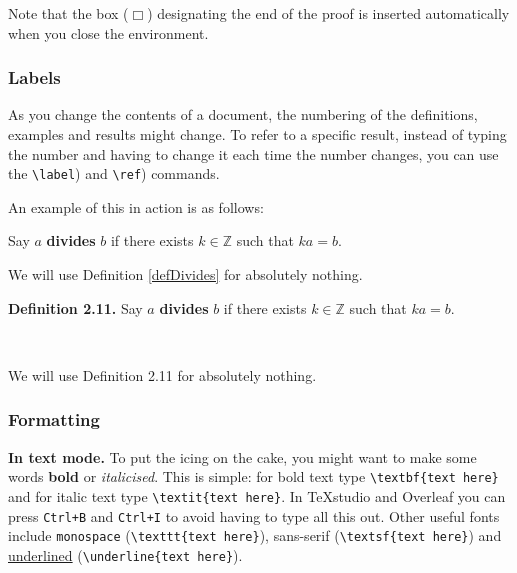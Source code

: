 Note that the box ($\Box$) designating the end of the proof is inserted automatically when you close the  environment.

\subsubsection*{Labels}
As you change the contents of a document, the numbering of the definitions, examples and results might change. To refer to a specific result, instead of typing the number and having to change it each time the number changes, you can use the \lstinline|\label|) and \lstinline|\ref|) commands.

An example of this in action is as follows:

\begin{texcodeleft}
\begin{definition}
\label{defDivides}
Say $a$ \textbf{divides} $b$ if there exists $k \in \mathbb{Z}$ such that $ka = b$.
\end{definition}

We will use Definition \ref{defDivides} for absolutely nothing.
\end{texcodeleft}
%
\begin{texcoderight}
\textbf{Definition 2.11.} Say $a$ \textbf{divides} $b$ if there exists $k \in \mathbb{Z}$ such that $ka=b$.

$ $

We will use Definition 2.11 for absolutely nothing.
\end{texcoderight}

\subsubsection*{Formatting}
\textbf{In text mode.} To put the icing on the cake, you might want to make some words \textbf{bold} or \textit{italicised}. This is simple: for bold text type \lstinline|\textbf{text here}| and for italic text type \lstinline|\textit{text here}|. In TeXstudio and Overleaf you can press \texttt{Ctrl+B} and \texttt{Ctrl+I} to avoid having to type all this out. Other useful fonts include \texttt{monospace} (\lstinline|\texttt{text here}|), \textsf{sans-serif} (\lstinline|\textsf{text here}|) and \underline{underlined} (\lstinline|\underline{text here}|).

